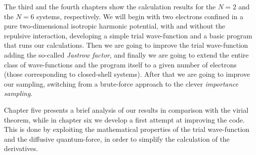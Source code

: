 The third and the fourth chapters show the calculation results for the $N=2$ and the $N=6$ systems, respectively. We will begin with two electrons confined in a pure two-dimensional isotropic harmonic potential, with and without the repulsive interaction, developing a simple trial wave-function and a basic program that runs our calculations. Then we are going to improve the trial wave-function adding the so-called \emph{Jastrow factor}, and finally we are going to extend the entire class of wave-functions and the program itself to a given number of electrons (those corresponding to closed-shell systems). After that we are going to improve our sampling, switching from a brute-force approach to the clever \emph{importance sampling}.

Chapter five presents a brief analysis of our results in comparison with the virial theorem, while in chapter six we develop a first attempt at improving the code. This is done by exploiting the mathematical properties of the trial wave-function and the diffusive quantum-force, in order to simplify the calculation of the derivatives.
